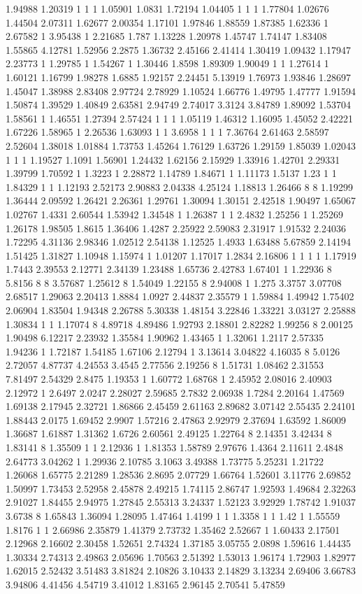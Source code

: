 1.94988 1.20319 1 1 1 1.05901 1.0831 1.72194 1.04405 1 1 1 1.77804 1.02676 1.44504 2.07311 1.62677 2.00354 1.17101 1.97846 1.88559 1.87385 1.62336 1 2.67582 1 3.95438 1 2.21685 1.787 1.13228 1.20978 1.45747 1.74147 1.83408 1.55865 4.12781 1.52956 2.2875 1.36732 2.45166 2.41414 1.30419 1.09432 1.17947 2.23773 1 1.29785 1 1.54267 1 1.30446 1.8598 1.89309 1.90049 1 1 1.27614 1 1.60121 1.16799 1.98278 1.6885 1.92157 2.24451 5.13919 1.76973 1.93846 1.28697 1.45047 1.38988 2.83408 2.97724 2.78929 1.10524 1.66776 1.49795 1.47777 1.91594 1.50874 1.39529 1.40849 2.63581 2.94749 2.74017 3.3124 3.84789 1.89092 1.53704 1.58561 1 1.46551 1.27394 2.57424 1 1 1 1.05119 1.46312 1.16095 1.45052 2.42221 1.67226 1.58965 1 2.26536 1.63093 1 1 3.6958 1 1 1 7.36764 2.61463 2.58597 2.52604 1.38018 1.01884 1.73753 1.45264 1.76129 1.63726 1.29159 1.85039 1.02043 1 1 1 1.19527 1.1091 1.56901 1.24432 1.62156 2.15929 1.33916 1.42701 2.29331 1.39799 1.70592 1 1.3223 1 2.28872 1.14789 1.84671 1 1.11173 1.5137 1.23 1 1 1.84329 1 1 1.12193 2.52173 2.90883 2.04338 4.25124 1.18813 1.26466 8 8 1.19299 1.36444 2.09592 1.26421 2.26361 1.29761 1.30094 1.30151 2.42518 1.90497 1.65067 1.02767 1.4331 2.60544 1.53942 1.34548 1 1.26387 1 1 2.4832 1.25256 1 1.25269 1.26178 1.98505 1.8615 1.36406 1.4287 2.25922 2.59083 2.31917 1.91532 2.24036 1.72295 4.31136 2.98346 1.02512 2.54138 1.12525 1.4933 1.63488 5.67859 2.14194 1.51425 1.31827 1.10948 1.15974 1 1.01207 1.17017 1.2834 2.16806 1 1 1 1 1.17919 1.7443 2.39553 2.12771 2.34139 1.23488 1.65736 2.42783 1.67401 1 1.22936 8 5.8156 8 8 3.57687 1.25612 8 1.54049 1.22155 8 2.94008 1 1.275 3.3757 3.07708 2.68517 1.29063 2.20413 1.8884 1.0927 2.44837 2.35579 1 1.59884 1.49942 1.75402 2.06904 1.83504 1.94348 2.26788 5.30338 1.48154 3.22846 1.33221 3.03127 2.25888 1.30834 1 1 1.17074 8 4.89718 4.89486 1.92793 2.18801 2.82282 1.99256 8 2.00125 1.90498 6.12217 2.23932 1.35584 1.90962 1.43465 1 1.32061 1.2117 2.57335 1.94236 1 1.72187 1.54185 1.67106 2.12794 1 3.13614 3.04822 4.16035 8 5.0126 2.72057 4.87737 4.24553 3.4545 2.77556 2.19256 8 1.51731 1.08462 2.31553 7.81497 2.54329 2.8475 1.19353 1 1.60772 1.68768 1 2.45952 2.08016 2.40903 2.12972 1 2.6497 2.0247 2.28027 2.59685 2.7832 2.06938 1.7284 2.20164 1.47569 1.69138 2.17945 2.32721 1.86866 2.45459 2.61163 2.89682 3.07142 2.55435 2.24101 1.88443 2.0175 1.69452 2.9907 1.57216 2.47863 2.92979 2.37694 1.63592 1.86009 1.36687 1.61887 1.31362 1.6726 2.60561 2.49125 1.22764 8 2.14351 3.42434 8 1.83141 8 1.35509 1 1 2.12936 1 1.81353 1.58789 2.97676 1.4364 2.11611 2.4848 2.64773 3.04262 1 1.29936 2.10785 3.1063 3.49388 1.73775 5.25231 1.21722 1.26068 1.65775 2.21289 1.28536 2.8695 2.07729 1.66764 1.52601 3.11776 2.69852 1.50997 1.73453 2.52958 2.45878 2.49215 1.74115 2.86747 1.92593 1.49684 2.32263 2.91027 1.84455 2.94975 1.27845 2.55313 3.24337 1.52123 3.92929 1.78742 1.91037 3.6738 8 1.65843 1.36094 1.28095 1.47464 1.4199 1 1 1.3358 1 1 1.42 1 1.55559 1.8176 1 1 2.66986 2.35879 1.41379 2.73732 1.35462 2.52667 1 1.60433 2.17501 2.12968 2.16602 2.30458 1.52651 2.74324 1.37185 3.05755 2.0898 1.59616 1.44435 1.30334 2.74313 2.49863 2.05696 1.70563 2.51392 1.53013 1.96174 1.72903 1.82977 1.62015 2.52432 3.51483 3.81824 2.10826 3.10433 2.14829 3.13234 2.69406 3.66783 3.94806 4.41456 4.54719 3.41012 1.83165 2.96145 2.70541 5.47859 